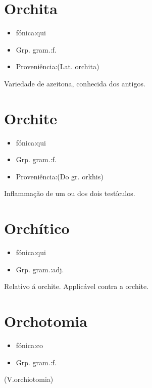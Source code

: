 \section{Orchita}
\begin{itemize}
\item {fónica:qui}
\end{itemize}
\begin{itemize}
\item {Grp. gram.:f.}
\end{itemize}
\begin{itemize}
\item {Proveniência:(Lat. \textunderscore orchita\textunderscore )}
\end{itemize}
Variedade de azeitona, conhecida dos antigos.
\section{Orchite}
\begin{itemize}
\item {fónica:qui}
\end{itemize}
\begin{itemize}
\item {Grp. gram.:f.}
\end{itemize}
\begin{itemize}
\item {Proveniência:(Do gr. \textunderscore orkhis\textunderscore )}
\end{itemize}
Inflammação de um ou dos dois testículos.
\section{Orchítico}
\begin{itemize}
\item {fónica:qui}
\end{itemize}
\begin{itemize}
\item {Grp. gram.:adj.}
\end{itemize}
Relativo á orchite.
Applicável contra a orchite.
\section{Orchotomia}
\begin{itemize}
\item {fónica:co}
\end{itemize}
\begin{itemize}
\item {Grp. gram.:f.}
\end{itemize}
(V.orchiotomia)
